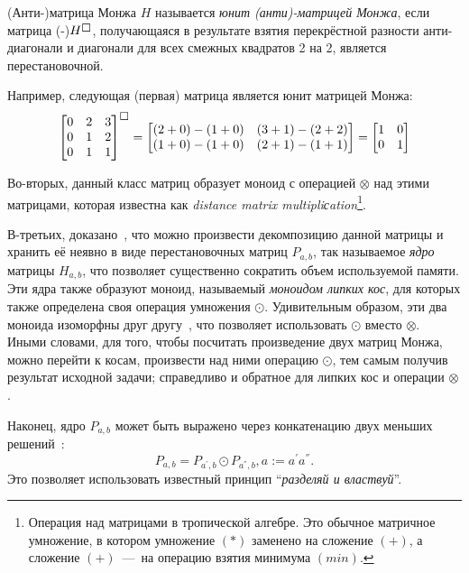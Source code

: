 \begin{definition}(Анти-)матрица Монжа $H$ называется \emph{юнит (анти)-матрицей Монжа}, если матрица (-)$H^{\msquare}$, получающаяся в результате взятия перекрёстной разности анти-диагонали и диагонали для всех смежных квадратов 2 на 2, является перестановочной.
\end{definition}
Например, следующая (первая) матрица является юнит матрицей Монжа:
\begin{equation}
\begin{bmatrix}
0 & 2 & 3 \\
0 & 1 & 2 \\
0 & 1 & 1
\end{bmatrix} ^ { \msquare} =
\begin{bmatrix}
(2 + 0) - (1 + 0)  & (3 + 1) - (2 + 2)  \\
(1 + 0) - (1 + 0) &  (2 + 1) - (1 + 1) 
\end{bmatrix} = 
\begin{bmatrix}
1 & 0  \\
0 & 1 
\end{bmatrix} 
\end{equation}

Во-вторых, данный класс матриц образует моноид с операцией $\otimes$ над этими матрицами, которая известна как \emph{distance matrix multipliсation}\footnote{Операция над матрицами в тропической алгебре. Это обычное матричное умножение, в котором умножение $(*)$ заменено на сложение $(+)$, а сложение $(+)$~---~на операцию взятия минимума $(min)$.}.

В-третьих, доказано~\cite{tiskin2006all}, что можно произвести декомпозицию данной матрицы и хранить её неявно в виде перестановочных матриц $P_{a,b}$, так называемое \emph{ядро} матрицы $H_{a,b}$, что позволяет существенно сократить объем используемой памяти.
Эти ядра также образуют моноид, называемый \emph{моноидом липких кос}, для которых также определена своя операция умножения $\odot$.
Удивительным образом, эти два моноида изоморфны друг другу~\cite{tiskin2006all}, что позволяет использовать $\odot$ вместо $\otimes$. 
Иными словами, для того, чтобы посчитать произведение двух матриц Монжа, можно перейти к косам, произвести над ними операцию $\odot$, тем самым получив результат исходной задачи; справедливо и обратное для липких кос и операции $\otimes$.
    
Наконец, ядро $P_{a,b}$ может быть выражено через конкатенацию двух меньших решений~\cite{tiskin2006all}:
\begin{equation}\label{formulaKernelCompistion}
P_{a,b}  = P_{a^{'},b} \odot P_{a^{''},b}, a  := a^{'}a^{''}.
\end{equation}
Это позволяет использовать известный принцип ``\emph{разделяй и властвуй}''.

